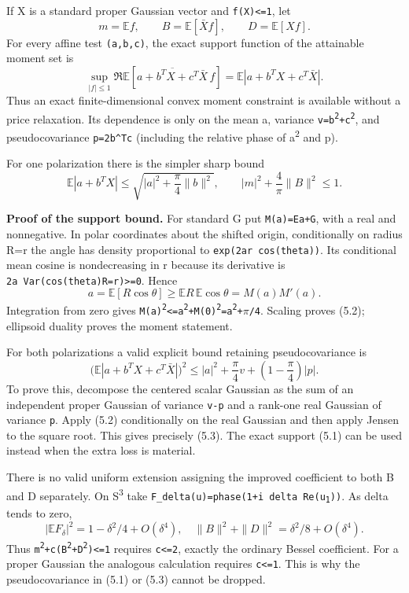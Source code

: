If X is a standard proper Gaussian vector and
\texttt{\textbar{}f(X)\textbar{}\textless{}=1}, let \[
 m=\mathbb Ef,\qquad B=\mathbb E[\bar Xf],\qquad
 D=\mathbb E[Xf].
\] For every affine test \texttt{(a,b,c)}, the exact support function of
the attainable moment set is \[
 \sup_{|f|\le1}\Re\mathbb E[\overline{a+b^TX+c^T\bar X}\,f]
 =\mathbb E|a+b^TX+c^T\bar X|.
\tag{5.1}
\] Thus an exact finite-dimensional convex moment constraint is
available without a price relaxation. Its dependence is only on the mean
a, variance
\texttt{v=\textbar{}\textbar{}b\textbar{}\textbar{}\textsuperscript{2}+\textbar{}\textbar{}c\textbar{}\textbar{}\textsuperscript{2}},
and pseudocovariance \texttt{p=2b\^{}Tc} (including the relative phase
of a\textsuperscript{2} and p).

For one polarization there is the simpler sharp bound \[
 \mathbb E|a+b^TX|\le\sqrt{|a|^2+\frac\pi4\|b\|^2},
 \qquad |m|^2+\frac4\pi\|B\|^2\le1.
\tag{5.2}
\]

\textbf{Proof of the support bound.} For standard G put
\texttt{M(a)=E\textbar{}a+G\textbar{}}, with a real and nonnegative. In
polar coordinates about the shifted origin, conditionally on radius R=r
the angle has density proportional to \texttt{exp(2ar\ cos(theta))}. Its
conditional mean cosine is nondecreasing in r because its derivative is
\texttt{2a\ Var(cos(theta)\textbar{}R=r)\textgreater{}=0}. Hence \[
 a=\mathbb E[R\cos\theta]\ge
        \mathbb ER\,\mathbb E\cos\theta=M(a)M'(a).
\] Integration from zero gives
\texttt{M(a)\textsuperscript{2}\textless{}=a\textsuperscript{2}+M(0)\textsuperscript{2}=a\textsuperscript{2}+\ensuremath{\pi}/4}. Scaling proves (5.2);
ellipsoid duality proves the moment statement.

For both polarizations a valid explicit bound retaining pseudocovariance
is \[
 \boxed{\quad
 \bigl(\mathbb E|a+b^TX+c^T\bar X|\bigr)^2
 \le |a|^2+\frac\pi4v+\left(1-\frac\pi4\right)|p|.
 \quad}
\tag{5.3}
\] To prove this, decompose the centered scalar Gaussian as the sum of
an independent proper Gaussian of variance
\texttt{v-\textbar{}p\textbar{}} and a rank-one real Gaussian of
variance \texttt{\textbar{}p\textbar{}}. Apply (5.2) conditionally on
the real Gaussian and then apply Jensen to the square root. This gives
precisely (5.3). The exact support (5.1) can be used instead when the
extra loss is material.

There is no valid uniform extension assigning the improved coefficient
to both B and D separately. On S\textsuperscript{3} take
\texttt{F\_delta(u)=phase(1+i\ delta\ Re(u\textsubscript{1}))}. As delta tends to zero,
\[
 |\mathbb EF_\delta|^2=1-\delta^2/4+O(\delta^4),
 \quad \|B\|^2+\|D\|^2=\delta^2/8+O(\delta^4).
\] Thus
\texttt{\textbar{}m\textbar{}\textsuperscript{2}+c(\textbar{}\textbar{}B\textbar{}\textbar{}\textsuperscript{2}+\textbar{}\textbar{}D\textbar{}\textbar{}\textsuperscript{2})\textless{}=1}
requires \texttt{c\textless{}=2}, exactly the ordinary Bessel
coefficient. For a proper Gaussian the analogous calculation requires
\texttt{c\textless{}=1}. This is why the pseudocovariance in (5.1) or
(5.3) cannot be dropped.

